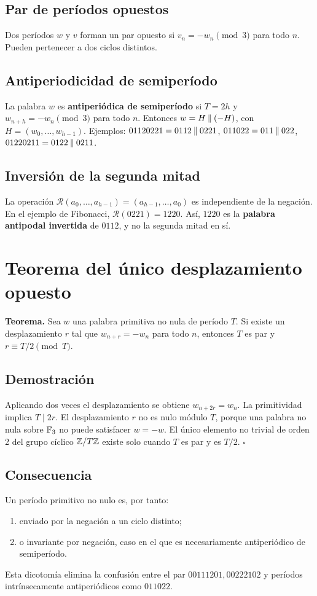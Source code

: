 \documentclass[11pt,a4paper]{article}
\begin{document}
\subsection{Par de períodos opuestos}
Dos períodos \(w\) y \(v\) forman un par opuesto si \(v_n=-w_n\pmod3\) para todo \(n\). Pueden pertenecer a dos ciclos distintos.
\subsection{Antiperiodicidad de semiperíodo}
La palabra \(w\) es \textbf{antiperiódica de semiperíodo} si \(T=2h\) y \(w_{n+h}=-w_n\pmod3\) para todo \(n\). Entonces \(w=H\mathbin{\Vert}(-H)\), con \(H=(w_0,\ldots,w_{h-1})\). Ejemplos: \(01120221=0112\mathbin{\Vert}0221\), \(011022=011\mathbin{\Vert}022\), \(01220211=0122\mathbin{\Vert}0211\).
\subsection{Inversión de la segunda mitad}
La operación \(\mathcal R(a_0,\ldots,a_{h-1})=(a_{h-1},\ldots,a_0)\) es independiente de la negación. En el ejemplo de Fibonacci, \(\mathcal R(0221)=1220\). Así, \(1220\) es la \textbf{palabra antipodal invertida} de \(0112\), y no la segunda mitad en sí.
\section{Teorema del único desplazamiento opuesto}
\begin{summarybox}\textbf{Teorema.} Sea \(w\) una palabra primitiva no nula de período \(T\). Si existe un desplazamiento \(r\) tal que \(w_{n+r}=-w_n\) para todo \(n\), entonces \(T\) es par y \(r\equiv T/2\pmod T\).\end{summarybox}
\subsection*{Demostración}
Aplicando dos veces el desplazamiento se obtiene \(w_{n+2r}=w_n\). La primitividad implica \(T\mid2r\). El desplazamiento \(r\) no es nulo módulo \(T\), porque una palabra no nula sobre \(\mathbb F_3\) no puede satisfacer \(w=-w\). El único elemento no trivial de orden 2 del grupo cíclico \(\mathbb Z/T\mathbb Z\) existe solo cuando \(T\) es par y es \(T/2\). \hfill\(\square\)
\subsection*{Consecuencia}
Un período primitivo no nulo es, por tanto: \begin{enumerate}\item enviado por la negación a un ciclo distinto;\item o invariante por negación, caso en el que es necesariamente antiperiódico de semiperíodo.\end{enumerate} Esta dicotomía elimina la confusión entre el par \(00111201,00222102\) y períodos intrínsecamente antiperiódicos como \(011022\).
\end{document}
